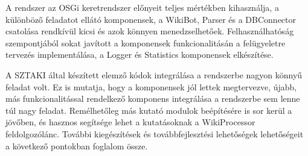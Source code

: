 A rendszer az OSGi keretrendszer előnyeit teljes mértékben kihasználja, a különböző feladatot ellátó komponensek, a WikiBot, Parser és a DBConnector csatolása rendkívül kicsi és azok könnyen menedzselhetőek. Felhasználhatóság szempontjából sokat javított a komponensek funkcionalitásán a felügyeletre tervezés implementálása, a Logger és Statistics komponensek elkészítése.

A SZTAKI által készített elemző kódok integrálása a rendszerbe nagyon könnyű feladat volt. Ez is mutatja, hogy a komponensek jól lettek megtervezve, újabb, más funkcionalitással rendelkező komponens integrálása a rendszerbe sem lenne túl nagy feladat. Remélhetőleg más kutató modulok beépítésére is sor kerül a jövőben, és hasznos segítsége lehet a kutatásoknak a WikiProcessor feldolgozólánc. További kiegészítések és továbbfejlesztési lehetőségek lehetőségeit a következő pontokban foglalom össze.

